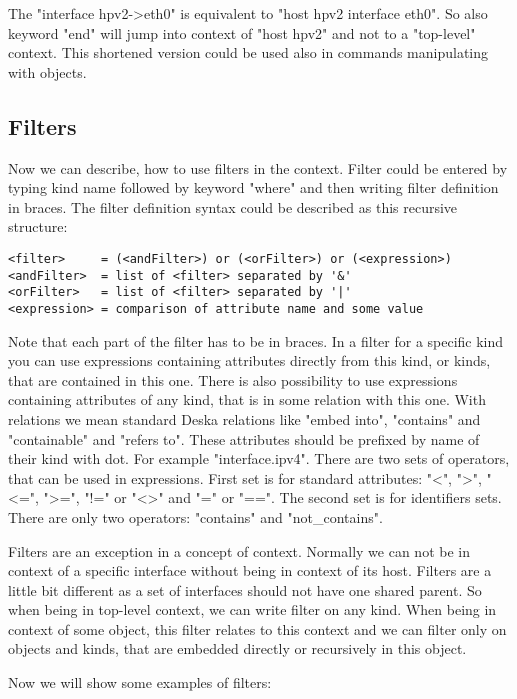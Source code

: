 \documentclass[deska]{subfiles}
\begin{document}
The "interface hpv2->eth0" is equivalent to "host hpv2 interface eth0". So also keyword "end" will jump into context of
"host hpv2" and not to a "top-level" context. This shortened version could be used also in commands manipulating with
objects.

\subsection{Filters}

Now we can describe, how to use filters in the context. Filter could be entered by typing kind name followed by keyword
"where" and then writing filter definition in braces. The filter definition syntax could be described as this recursive
structure:

\begin{verbatim}
<filter>     = (<andFilter>) or (<orFilter>) or (<expression>)
<andFilter>  = list of <filter> separated by '&'
<orFilter>   = list of <filter> separated by '|'
<expression> = comparison of attribute name and some value
\end{verbatim}

Note that each part of the filter has to be in braces. In a filter for a specific kind you can use expressions containing
attributes directly from this kind, or kinds, that are contained in this one. There is also possibility to use expressions
containing attributes of any kind, that is in some relation with this one. With relations we mean standard Deska relations
like "embed into", "contains" and "containable" and "refers to". These attributes should be prefixed by name of their
kind with dot. For example "interface.ipv4". There are two sets of operators, that can be used in expressions. First
set is for standard attributes: "<", ">", "<=", ">=", "!=" or "<>" and "=" or "==". The second set is for identifiers
sets. There are only two operators: "contains" and "not\_contains".

Filters are an exception in a concept of context. Normally we can not be in context of a specific interface without being
in context of its host. Filters are a little bit different as a set of interfaces should not have one shared parent. So
when being in top-level context, we can write filter on any kind. When being in context of some object, this filter
relates to this context and we can filter only on objects and kinds, that are embedded directly or recursively in this object.

Now we will show some examples of filters:
\end{document}
